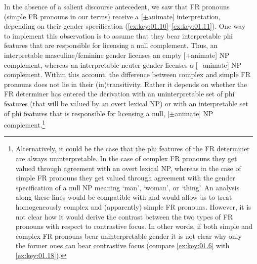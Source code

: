 \documentclass[output=paper]{langsci/langscibook}
\begin{document}
In the absence of a salient discourse antecedent, we saw that \gls{FR} pronouns
(simple \gls{FR} pronouns in our
terms) receive a [$\pm$animate] interpretation, depending on their gender
specification (\ref{ex:key:01.10}--\ref{ex:key:01.11}). One way to implement
this observation is to assume that they bear interpretable phi features that
are responsible for licensing a null complement. Thus, an interpretable
masculine/feminine gender licenses an empty [+animate] NP complement, whereas
an interpretable neuter gender licenses a [−animate] NP complement. Within this
account, the difference between complex and simple \gls{FR}
pronouns does not lie in their
(in)transitivity. Rather it depends on whether the \gls{FR} determiner has
entered the derivation with an uninterpretable set of phi features (that will
be valued by an overt lexical NP) or with an interpretable set of phi features
that is responsible for licensing a null, [$\pm$animate] NP
complement.\footnote{Alternatively, it could be the case that the phi features
    of the \gls{FR} determiner are always uninterpretable. In the case of
    complex \gls{FR} pronouns they
    get valued through agreement with an overt lexical NP, whereas in the case
    of simple \gls{FR} pronouns
    they get valued through agreement with the gender specification of a null
    NP meaning ‘man’, ‘woman’, or ‘thing’. An analysis along these lines would
    be compatible with \textcite{Panagiotidis2003} and would allow us to treat
    homogeneously complex and (apparently) simple \gls{FR} pronouns. However,
    it is not clear how it would derive the contrast between the two types of
    \gls{FR} pronouns with respect
    to contrastive focus. In other words, if both
    simple and complex \gls{FR} pronouns bear uninterpretable gender it is not
    clear why only the former ones can bear contrastive
    focus (compare \eqref{ex:key:01.6} with
\eqref{ex:key:01.18}).}
\end{document}
